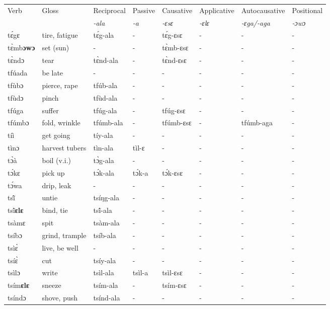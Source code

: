 \begin{sidewaystable}
\begin{tabular}{llllllll}
 \lsptoprule
 Verb & Gloss & Reciprocal & Passive  & Causative  & Applicative   & Autocausative & Positional   \\
  &    & {\itshape -ala} & {\itshape -a} & {\itshape -ɛsɛ} & {\itshape -ɛlɛ} & {\itshape -ɛga/-aga}  & {\itshape -ɔwɔ}  \\
\midrule
tɛ́gɛ & tire, fatigue & tɛ́g-ala & - & tɛ́g-ɛsɛ  & - &  - & - \\
tɛ̀mb{\bfseries ɔwɔ} & set (sun) & - & - & tɛ̀mb-ɛsɛ & - & - & - \\
tɛ̀ndɔ & tear & tɛ̀nd-ala & - &  tɛ̀nd-ɛsɛ & - &  - &  - \\
tfúada & be late & - & - & - & - & - & - \\
tfùbɔ & pierce, rape & tfúb-ala & - & - & - & - &  - \\
tfùdɔ & pinch & tfùd-ala & - & - & -  & - &  - \\
tfúga & suffer & tfúg-ala & - & tfúg-ɛsɛ & - & - & - \\
tfúmbɔ & fold, wrinkle & tfúmb-ala & - & tfúmb-ɛsɛ & - & tfúmb-aga & - \\
tíì &  get going & tíy-ala & - & - & - & - &  - \\
tìnɔ & harvest tubers & tìn-ala & tìl-ɛ & - & - & - & - \\
tɔ̀à & boil (v.i.) & tɔ̀g-ala & - & - & - & - & - \\
tɔ́kɛ & pick up & tɔ́k-ala & tɔ́k-a & tɔ́k-ɛsɛ & - &  - & - \\
tɔ́wa & drip, leak & - & - & - & - & - & - \\
tsĩ̂ & untie & tsíŋg-ala & - & - & - & - & - \\
tsĩ́{\bfseries ɛlɛ} & bind, tie & tsĩ́-ala & - & - &  - & - &  - \\
tsàmɛ & spit & tsàm-ala & - & - & -  & - & - \\
tsíbɔ & grind, trample & tsíb-ala & - & - & - & - & - \\
tsìɛ̀ & live, be well & - & - & - & -  & - & - \\
tsíɛ̀ & cut & tsíy-ala & - & - & - & - & - \\
tsìlɔ & write & tsìl-ala & tsìl-a & tsìl-ɛsɛ & - & - & - \\
tsím{\bfseries ɛlɛ} & sneeze & tsím-ala & - & tsím-ɛsɛ & - & - & - \\
 tsíndɔ &  shove, push & tsínd-ala & - & - & - & - & - \\
\midrule\end{tabular}\end{sidewaystable}

